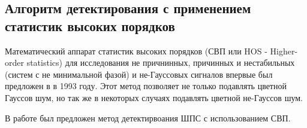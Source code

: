 \subsection{Алгоритм детектирования с применением статистик высоких порядков}
\label{sbs:sec1_hos}

Математический аппарат статистик высоких порядков (СВП или HOS - Higher-order statistics)
для исследования не причнинных, причинных и нестабильных
(систем с не минимальной фазой) и не-Гауссовых сигналов впервые был предложен в \cite{hos_petropulu} в 1993 году.
Этот метод позволяет не только подавлять цветной Гауссов шум, но так же в некоторых случаях подавлять
цветной не-Гауссов шум.

В работе \cite{hos_zhao} был предложен метод детектирвоания ШПС с использованием СВП.

\newpage
